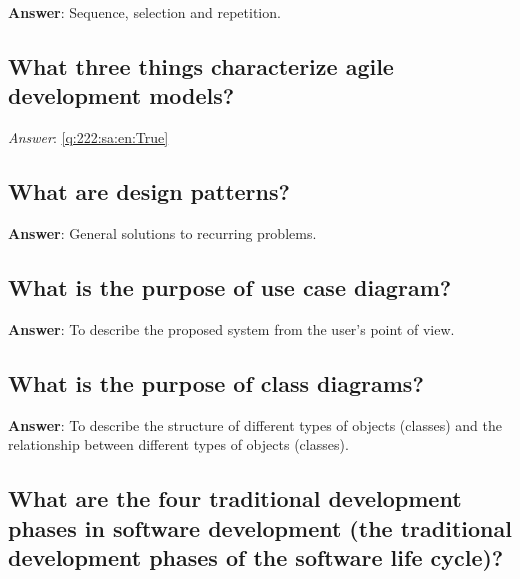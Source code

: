 \documentclass[a4paper,11pt,oneside]{article}
\begin{document}
\begin{sloppypar}
\label{q:221:sa:en:True}

\textbf{Answer}: Sequence, selection and repetition.



\subsection{What three things characterize agile development models?}

\label{q:222:sa:en:True}

\vspace{2cm}

\noindent\makebox[\textwidth]{\hrulefill}

\vspace{1cm}

\textit{Answer}: \autoref{q:222:sa:en:True}



\subsection{What are design patterns?}

\label{q:223:sa:en:True}

\textbf{Answer}: General solutions to recurring problems.



\subsection{What is the purpose of use case diagram?}

\label{q:224:sa:en:True}

\textbf{Answer}: To describe the proposed system from the user's point of view.



\subsection{What is the purpose of class diagrams?}

\label{q:225:sa:en:True}

\textbf{Answer}: To describe the structure of different types of objects (classes) and the relationship between different types of objects (classes).



\subsection{What are the four traditional development phases in software development (the traditional development phases of the software life cycle)?}


\end{sloppypar}
\end{document}
